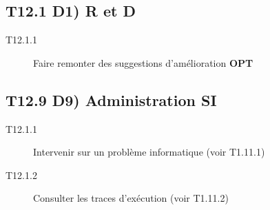 	\subsection*{T12.1 D1) R et D}
	\begin{description}
		\item[T12.1.1] Faire remonter des suggestions d'amélioration \textbf{OPT}
	\end{description}
	
	\subsection*{T12.9 D9) Administration SI}
	\begin{description}
		\item[T12.1.1] Intervenir sur un problème informatique (voir T1.11.1)
		\item[T12.1.2] Consulter les traces d'exécution (voir T1.11.2)
	\end{description}
